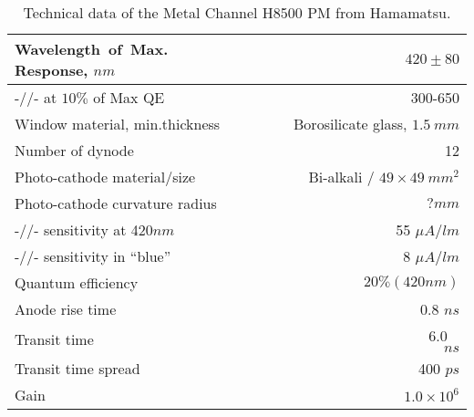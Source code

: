 \begin{table}[htbp]
\begin{center}
\begin{tabular}{|l|r|} \hline
Wavelength~of~Max. Response, $nm$  &      $420\pm80$ \\\hline
-//- at  $10\%$ of Max QE                & 300-650 \\\hline
Window material, min.thickness &   Borosilicate glass, $1.5~mm$ \\\hline
Number of dynode   &   12\\\hline
Photo-cathode material/size & Bi-alkali / $49\times49~mm^2$\\\hline
Photo-cathode curvature radius &   $? mm $\\\hline
-//- sensitivity at 420$nm$   &  55 $\mu A/lm$ \\\hline
-//- sensitivity in  ``blue''&  8 $\mu A/lm$\\\hline
Quantum efficiency & $20\%(420nm)$\\\hline
Anode rise time&~~~~~~~~~~~~~~~~~~~~0.8 $ns$\\\hline
Transit time &~~~~~~~~~~~~~~~~~~~~~~6.0 ~$ns$\\\hline
Transit time spread&~~~~~~~~~~~~~~~~400 $ps$\\ \hline
Gain & $1.0 \times 10^6$\\ \hline
\end{tabular}
\caption{Technical data of the Metal Channel 
H8500 PM from Hamamatsu.\label{h8500}}
\end{center}
\end{table}


